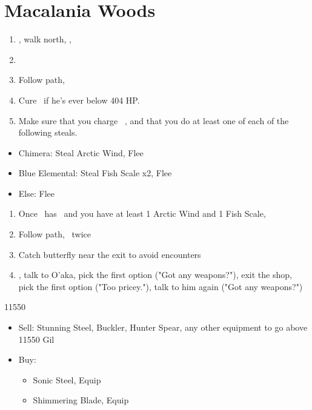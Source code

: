 \chapter{Macalania Woods}

\begin{enumerate}
	\item \sd, walk north, \sd, \save
	\item \formation{\tidus}{\rikku}{\auron}
	\item Follow path, 
	\item Cure \tidus\ if he's ever below 404 HP.
	\item Make sure that you charge \rikku\ \od, and that you do at least one of each of the following steals.
\end{enumerate}
\begin{encounters}
	\begin{itemize}
		\item Chimera: Steal Arctic Wind, Flee
		\item Blue Elemental: Steal Fish Scale x2, Flee
		\item Else: Flee
	\end{itemize}
\end{encounters}
\begin{enumerate}[resume]
	\item Once \rikku\ has \od\ and you have at least 1 Arctic Wind and 1 Fish Scale, \formation{\tidus}{\yuna}{\kimahri}
	\item Follow path, \sd\ twice
	\item Catch butterfly near the exit to avoid encounters
	\formation{\tidus}{\yuna}{\kimahri}
	\item \save, talk to O'aka, pick the first option ("Got any weapons?"), exit the shop, pick the first option ("Too pricey."), talk to him again ("Got any weapons?")
\end{enumerate}
\begin{shop}{11550}
	\begin{itemize}
		\item Sell: Stunning Steel, Buckler, Hunter Spear, any other equipment to go above 11550 Gil
		\item Buy:
			\begin{itemize}
				\item Sonic Steel, Equip
				\item Shimmering Blade, Equip
			\end{itemize}
	\end{itemize}
\end{shop}
